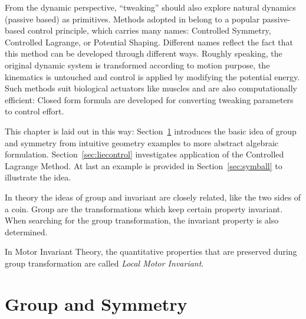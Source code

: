 From the dynamic perspective, ``tweaking''  should also explore natural dynamics (passive based) as primitives.
Methods adopted in \moit belong to  a popular passive-based control principle, which carries many names: Controlled Symmetry, Controlled Lagrange, or Potential Shaping.
Different names reflect the fact that this method can be developed through different ways.
Roughly speaking, the original dynamic system is transformed according to motion purpose, the kinematics is untouched and control is applied by modifying the potential energy.
Such methods suit biological actuators like muscles and are also computationally efficient:
Closed form formula are developed for converting tweaking parameters to control effort.

This chapter is laid out in this way:
Section~\ref{sec:groupandsymmetry} introduces the basic idea of group and symmetry from intuitive geometry examples to more abstract algebraic formulation. Section~\ref{sec:liecontrol} investigates application of the Controlled Lagrange Method.
At last an example is provided in Section~\ref{sec:symball} to illustrate the idea.

In theory the ideas of group and invariant are closely related, like the two sides of a coin.
Group are the transformations which keep certain property invariant.
When searching for the group transformation, the invariant property is also determined.

In Motor Invariant Theory, the quantitative properties that are  preserved during group transformation are called \emph{Local Motor Invariant}.







\section{Group and Symmetry}
\label{sec:groupandsymmetry}
%
%



